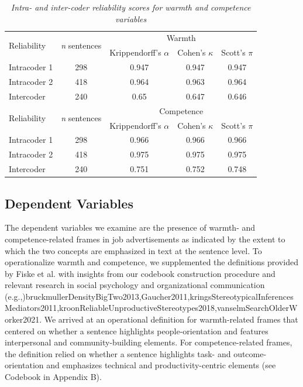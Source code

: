 \documentclass[Royal,sageapa,times]{sagej}
\begin{document}
\begin{table}[ht]
    \small\sf\centering
    \caption{\textit{Intra- and inter-coder reliability scores for warmth and competence variables}}
    \label{table2}
    \vskip 4pt
    \begin{tabular}[]{@{}lcccc@{}}
    \toprule
    \multirow{2}{*}{Reliability} & \multirow{2}{*}{\textit{n} sentences} & \multicolumn{3}{c}{Warmth}\\
    \cmidrule(l){3-5}
    & & Krippendorff’s $\alpha$ & Cohen’s $\kappa$ & Scott’s $\pi$\\
    \midrule
    Intracoder 1 & 298 & 0.947 & 0.947 & 0.947\\
    Intracoder 2 & 418 & 0.964 & 0.963 & 0.964\\
    Intercoder   & 240 & 0.65  & 0.647 & 0.646\\
    \midrule[.75pt]
    \multirow{2}{*}{Reliability} & \multirow{2}{*}{\textit{n} sentences} & \multicolumn{3}{c}{Competence}\\
    \cmidrule(l){3-5}
    & & Krippendorff’s $\alpha$ & Cohen’s $\kappa$ & Scott’s $\pi$\\
    \midrule
    Intracoder 1 & 298 & 0.966 & 0.966 & 0.966\\
    Intracoder 2 & 418 & 0.975 & 0.975 & 0.975\\
    Intercoder   & 240 & 0.751 & 0.752 & 0.748\\
    \bottomrule
    \end{tabular}%
    \end{table}

\subsection{Dependent Variables\label{dependent_variables}}
The dependent variables we examine are the presence of warmth- and competence-related frames in job advertisements as indicated by the extent to which the two concepts are emphasized in text at the sentence level. To operationalize warmth and competence, we supplemented the definitions provided by Fiske et al.  with insights from our codebook construction procedure and relevant research in social psychology and organizational communication \shortcite(e.g.,){bruckmullerDensityBigTwo2013,Gaucher2011,kringsStereotypicalInferencesMediators2011,kroonReliableUnproductiveStereotypes2018,vanselmSearchOlderWorker2021}. We arrived at an operational definition for warmth-related frames that centered on whether a sentence highlights people-orientation and features interpersonal and community-building elements. For competence-related frames, the definition relied on whether a sentence highlights task- and outcome-orientation and emphasizes technical and productivity-centric elements (see Codebook in Appendix B).
\end{document}
